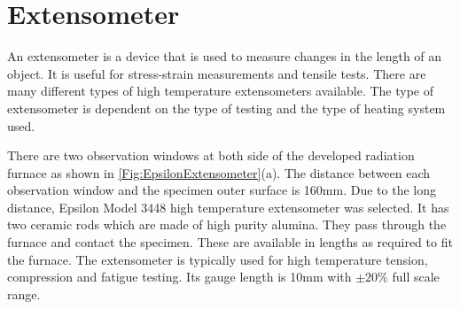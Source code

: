 



\section{Extensometer}
An extensometer is a device that is used to measure changes in the length of an object.
It is useful for stress-strain measurements and tensile tests.
There are many different types of high temperature extensometers available.
The type of extensometer is dependent on the type of testing and the type of heating system used.

There are two observation windows at both side of the developed radiation furnace as shown in \ref{Fig:EpsilonExtensometer}(a).
The distance between each observation window and the specimen outer surface is 160mm.
Due to the long distance, Epsilon Model 3448 high temperature extensometer was selected.
It has two ceramic rods which are made of high purity alumina.
They pass through the furnace and contact the specimen.
These are available in lengths as required to fit the furnace.
The extensometer is typically used for high temperature tension, compression and fatigue testing.
Its gauge length is 10mm with $\pm20\%$ full scale range.

